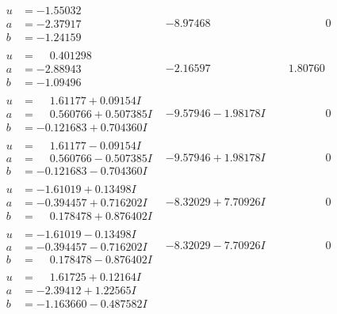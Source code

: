 \documentclass[1p]{elsarticle_modified}
\theoremstyle{definition}
\begin{document}
$$\begin{array}{c|c|c}
\begin{aligned}
u &= -1.55032\phantom{ +0.000000I} \\
a &= -2.37917\phantom{ +0.000000I} \\
b &= -1.24159\phantom{ +0.000000I}\end{aligned}
 & -8.97468\phantom{ +0.000000I} & \phantom{-0.000000 } 0 \\ \hline\begin{aligned}
u &= \phantom{-}0.401298\phantom{ +0.000000I} \\
a &= -2.88943\phantom{ +0.000000I} \\
b &= -1.09496\phantom{ +0.000000I}\end{aligned}
 & -2.16597\phantom{ +0.000000I} & \phantom{-}1.80760\phantom{ +0.000000I} \\ \hline\begin{aligned}
u &= \phantom{-}1.61177 + 0.09154 I \\
a &= \phantom{-}0.560766 + 0.507385 I \\
b &= -0.121683 + 0.704360 I\end{aligned}
 & -9.57946 - 1.98178 I & \phantom{-0.000000 } 0 \\ \hline\begin{aligned}
u &= \phantom{-}1.61177 - 0.09154 I \\
a &= \phantom{-}0.560766 - 0.507385 I \\
b &= -0.121683 - 0.704360 I\end{aligned}
 & -9.57946 + 1.98178 I & \phantom{-0.000000 } 0 \\ \hline\begin{aligned}
u &= -1.61019 + 0.13498 I \\
a &= -0.394457 + 0.716202 I \\
b &= \phantom{-}0.178478 + 0.876402 I\end{aligned}
 & -8.32029 + 7.70926 I & \phantom{-0.000000 } 0 \\ \hline\begin{aligned}
u &= -1.61019 - 0.13498 I \\
a &= -0.394457 - 0.716202 I \\
b &= \phantom{-}0.178478 - 0.876402 I\end{aligned}
 & -8.32029 - 7.70926 I & \phantom{-0.000000 } 0 \\ \hline\begin{aligned}
u &= \phantom{-}1.61725 + 0.12164 I \\
a &= -2.39412 + 1.22565 I \\
b &= -1.163660 - 0.487582 I\end{aligned}

\end{array}$$
\end{document}
